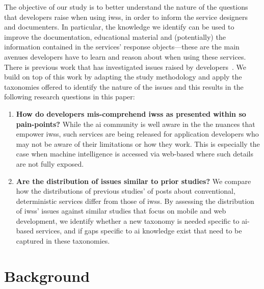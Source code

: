 The objective of our study is to better understand the nature of the questions
that developers raise when using \glspl{iws}, in order to inform the service designers and documenters. In particular, the knowledge we identify can be used to improve the documentation, educational material and (potentially) the information contained in the services' response objects---these are the main avenues developers have to learn and reason about when using these services. There is previous work that has investigated issues raised by developers~\citep{Tahir:2018ks, Beyer:2018fm, Aghajani:2019bo}. We build on top of this work by adapting the study methodology and apply the taxonomies offered to identify the nature of the issues and this results in the following research questions in this paper:

\begin{enumerate}[label=\textbf{RQ\arabic*.},leftmargin=0.1125\linewidth]
  \item \textbf{How do developers mis-comprehend \glspl{iws} as presented within \gls{so} pain-points?} While the \gls{ai} community is well aware in the the nuances that empower \glspl{iws}, such services are being released for application developers who may not be aware of their limitations or how they work. This is especially the case when machine intelligence is accessed via web-based  where such details are not fully exposed.
  \item \textbf{Are the distribution of issues similar to prior studies?}
  We compare how the distributions of previous studies' of posts about conventional, deterministic  services differ from those of \glspl{iws}. By assessing the distribution of \glspl{iws}' issues against similar studies that focus on mobile and web development, we identify whether a new taxonomy is needed specific to \gls{ai}-based services, and if gaps specific to \gls{ai} knowledge exist that need to be captured in these taxonomies.
\end{enumerate}


\section{Background}
\label{icse2020:sec:related-work}

